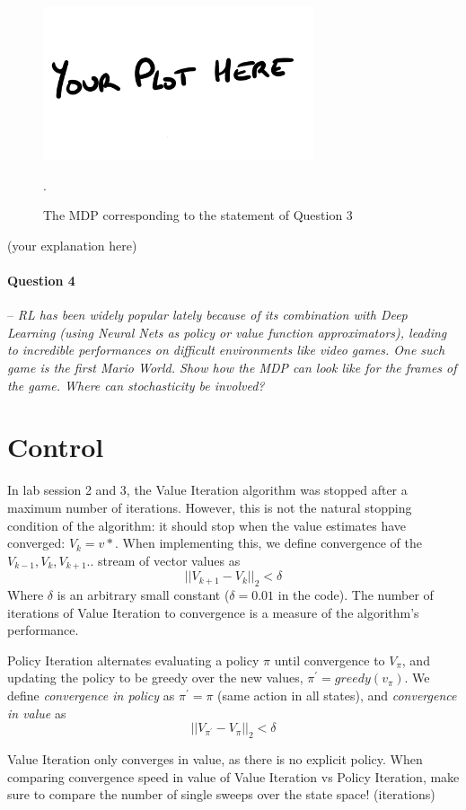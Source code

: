 \documentclass[a4paper]{article}
\newcommand{\question}[2]{
\paragraph{Question #1} -- \textit{#2}

}
\begin{document}
			\begin{figure}[H]
				\centering
				\includegraphics[width=8cm]{plots/your_plot_here.png}
				\caption{The MDP corresponding to the statement of Question 3}.
				\label{fig:q3}
			\end{figure}{}
			(your explanation here)

		\question{4}{RL has been widely popular lately because of its combination with Deep Learning (using Neural Nets as policy or value function approximators), leading to incredible performances on difficult environments like video games. 
				One such game is the first Mario World. 
				Show how the MDP can look like for the frames of the game. 
				Where can stochasticity be involved?}


	\section{Control}
		In lab session 2 and 3, the Value Iteration algorithm was stopped after a maximum number of iterations. 
		However, this is not the natural stopping condition of the algorithm: it should stop when the value estimates have converged: $V_k = v*$. 
		When implementing this, we define convergence of the $V_{k-1},V_k,V_{k+1}..$ stream of vector values as $$ \vert\vert V_{k+1} - V_k \vert\vert_2 < \delta $$
		Where $\delta$ is an arbitrary small constant ($\delta = 0.01$ in the code). 
		The number of iterations of Value Iteration to convergence is a measure of the algorithm's performance.

		Policy Iteration alternates evaluating a policy $\pi$ until convergence to $V_\pi$, and updating the policy to be greedy over the new values, $\pi ^\prime = greedy(v_\pi)$. 
		We define \textit{convergence in policy} as  $\pi^\prime = \pi$ (same action in all states), and \textit{convergence in value} as $$ \vert\vert V_{\pi ^\prime} - V_\pi \vert\vert_2 < \delta $$

		Value Iteration only converges in value, as there is no explicit policy. 
		When comparing convergence speed in value of Value Iteration vs Policy Iteration, make sure to compare the number of single sweeps over the state space! (iterations)
\end{document}
